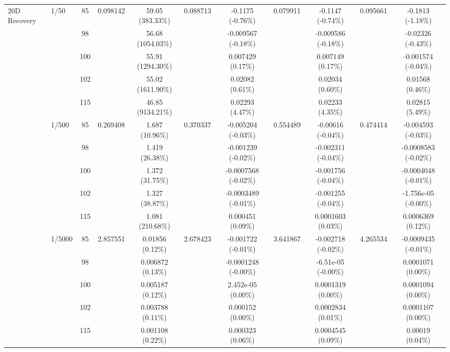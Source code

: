 \begin{table}[htbp]
{\begin{tabular}{llccccccccc}
\multirow{15}{*}{20D Recovery}
& \multirow{5}{*}{1/50} & 85 & \multirow{5}{*}{0.098142} & 59.05 (383.33\%) & \multirow{5}{*}{0.088713} & -0.1175 (-0.76\%) & \multirow{5}{*}{0.079911} & -0.1147 (-0.74\%) & \multirow{5}{*}{0.095661} & -0.1813 (-1.18\%) \\
& & 98 & & 56.68 (1054.03\%) & & -0.009567 (-0.18\%) & & -0.009586 (-0.18\%) & & -0.02326 (-0.43\%) \\
& & 100 & & 55.91 (1294.30\%) & & 0.007429 (0.17\%) & & 0.007149 (0.17\%) & & -0.001574 (-0.04\%) \\
& & 102 & & 55.02 (1611.90\%) & & 0.02082 (0.61\%) & & 0.02034 (0.60\%) & & 0.01568 (0.46\%) \\
& & 115 & & 46.85 (9134.21\%) & & 0.02293 (4.47\%) & & 0.02233 (4.35\%) & & 0.02815 (5.49\%) \\
\cmidrule(lr){2-11}
& \multirow{5}{*}{1/500} & 85 & \multirow{5}{*}{0.269408} & 1.687 (10.96\%) & \multirow{5}{*}{0.370337} & -0.005204 (-0.03\%) & \multirow{5}{*}{0.554489} & -0.00616 (-0.04\%) & \multirow{5}{*}{0.474414} & -0.004593 (-0.03\%) \\
& & 98 & & 1.419 (26.38\%) & & -0.001239 (-0.02\%) & & -0.002311 (-0.04\%) & & -0.0008583 (-0.02\%) \\
& & 100 & & 1.372 (31.75\%) & & -0.0007568 (-0.02\%) & & -0.001756 (-0.04\%) & & -0.0004048 (-0.01\%) \\
& & 102 & & 1.327 (38.87\%) & & -0.0003489 (-0.01\%) & & -0.001255 (-0.04\%) & & -1.756e-05 (-0.00\%) \\
& & 115 & & 1.081 (210.68\%) & & 0.000451 (0.09\%) & & 0.0001603 (0.03\%) & & 0.0006369 (0.12\%) \\
\cmidrule(lr){2-11}
& \multirow{5}{*}{1/5000} & 85 & \multirow{5}{*}{2.857551} & 0.01856 (0.12\%) & \multirow{5}{*}{2.678423} & -0.001722 (-0.01\%) & \multirow{5}{*}{3.641867} & -0.002718 (-0.02\%) & \multirow{5}{*}{4.265534} & -0.0009435 (-0.01\%) \\
& & 98 & & 0.006872 (0.13\%) & & -0.0001248 (-0.00\%) & & -6.51e-05 (-0.00\%) & & 0.0001071 (0.00\%) \\
& & 100 & & 0.005187 (0.12\%) & & 2.452e-05 (0.00\%) & & 0.0001319 (0.00\%) & & 0.0001094 (0.00\%) \\
& & 102 & & 0.003788 (0.11\%) & & 0.000152 (0.00\%) & & 0.0002834 (0.01\%) & & 0.0001107 (0.00\%) \\
& & 115 & & 0.001108 (0.22\%) & & 0.000323 (0.06\%) & & 0.0004545 (0.09\%) & & 0.00019 (0.04\%) \\
\bottomrule
  \end{tabular}%
  }
\end{table}

